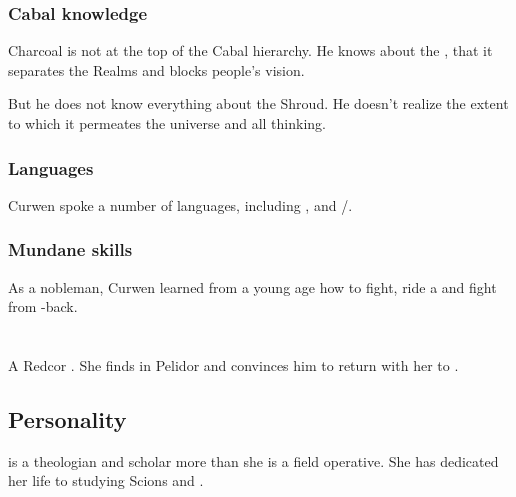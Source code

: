 \subsubsection{Cabal knowledge}
Charcoal is not at the top of the Cabal hierarchy. He knows about the , that it separates the Realms and blocks people's vision. 

But he does not know everything about the Shroud. He doesn't realize the extent to which it permeates the universe and all thinking. 





\subsubsection{Languages}
Curwen spoke a number of languages, including ,  and /. 





\subsubsection{Mundane skills}
As a nobleman, Curwen learned from a young age how to fight, ride a \relc{} and fight from \relc-back. 















\section{\Chyrie \Esmerel}
\index{\ChyrieEsmerel}
\index{\Esmerel!\Chyrie}
A Redcor \Matron{}. She finds  in Pelidor and convinces him to return with her to \Redce.









\subsection{Personality}
\Esmerel{} is a theologian and scholar more than she is a field operative. 
She has dedicated her life to studying Scions and \Malachim. 

